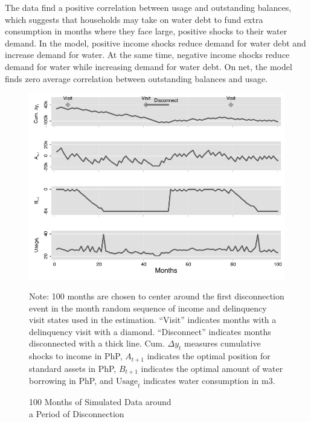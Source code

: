 \documentclass[12pt]{article}
\begin{document}
The data find a positive correlation between usage and outstanding balances, which suggests that households may take on water debt to fund extra consumption in months where they face large, positive shocks to their water demand.  In the model, positive income shocks reduce demand for water debt and increase demand for water. At the same time, negative income shocks reduce demand for water while increasing demand for water debt.  On net, the model finds zero average correlation between outstanding balances and usage. %

\begin{figure}[H]
\centering
\caption{100 Months of Simulated Data around \\ a Period of Disconnection}\label{figure:deaton}
\includegraphics[scale=1.1]{tables/new_deaton_graph.pdf} \\
{\scriptsize  
Note: 100 months are chosen to center around the first disconnection event in the month random sequence of income and delinquency visit states used in the estimation.  ``Visit'' indicates months with a delinquency visit with a diamond.  ``Disconnect'' indicates months disconnected with a thick line.  Cum. $\Delta y_t$ measures cumulative shocks to income in PhP, $A_{t+1}$ indicates the optimal position for standard assets in PhP, $B_{t+1}$ indicates the optimal amount of water borrowing in PhP, and $\text{Usage}_t$ indicates water consumption in m3.
\par}
\end{figure}
\end{document}
